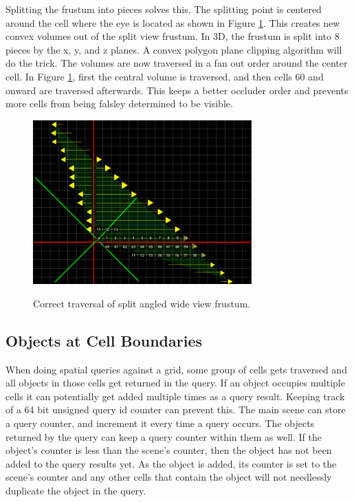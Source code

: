\documentclass[12pt]{ucthesis}
\newcommand{\captionfonts}{\small\bf\ssp}
\begin{document}
Splitting the frustum into pieces solves this.
The splitting point is centered around the cell where the eye is located as shown in Figure \ref{fig:correct-wide-frustum-iter}.
This creates new convex volumes out of the split view frustum.
In 3D, the frustum is split into 8 pieces by the x, y, and z planes.
A convex polygon plane clipping algorithm will do the trick.
The volumes are now traversed in a fan out order around the center cell.
In Figure \ref{fig:correct-wide-frustum-iter}, first the central volume is traversed, and then cells 60 and onward are traversed afterwards.
This keeps a better occluder order and prevents more cells from being falsley determined to be visible.

\begin{figure}
\begin{center}
\includegraphics[width=0.75\textwidth]{Images/wide-traversal.png}
\captionfonts
\caption[Correct Wide View Frustum]{Correct traversal of split angled wide view frustum.}
\label{fig:correct-wide-frustum-iter}
\end{center}
\end{figure}

\subsection{Objects at Cell Boundaries}
\label{objects-at-cell-boundaries}
When doing spatial queries against a grid, some group of cells gets traversed and all objects in those cells get returned in the query.
If an object occupies multiple cells it can potentially get added multiple times as a query result.
Keeping track of a 64 bit unsigned query id counter can prevent this.
The main scene can store a query counter, and increment it every time a query occurs.
The objects returned by the query can keep a query counter within them as well.
If the object's counter is less than the scene's counter, then the object has not been added to the query results yet.
As the object is added, its counter is set to the scene's counter and any other cells that contain the object will not needlessly duplicate the object in the query.
\end{document}

